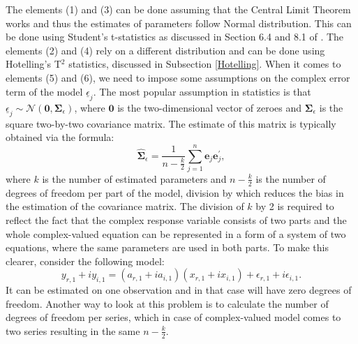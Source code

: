 \documentclass[
]{book}
\begin{document}
The elements (1) and (3) can be done assuming that the Central Limit Theorem works and thus the estimates of parameters follow Normal distribution. This can be done using Student's t-statistics as discussed in Section 6.4 and 8.1 of \citet{SvetunkovSBA}. The elements (2) and (4) rely on a different distribution and can be done using Hotelling's T\(^2\) statistics, discussed in Subsection \ref{Hotelling}. When it comes to elements (5) and (6), we need to impose some assumptions on the complex error term of the model \(\underline{\epsilon}_j\). The most popular assumption in statistics is that \(\underline{\epsilon}_j \sim \mathcal{N}(\boldsymbol{0}, \boldsymbol{\Sigma}_\epsilon)\), where \(\boldsymbol{0}\) is the two-dimensional vector of zeroes and \(\boldsymbol{\Sigma}_\epsilon\) is the square two-by-two covariance matrix. The estimate of this matrix is typically obtained via the formula:
\begin{equation*}
    \hat{\boldsymbol{\Sigma}}_\epsilon = \frac{1}{n-\frac{k}{2}} \sum_{j=1}^{n} \boldsymbol{e}_j \boldsymbol{e}_j^\prime ,
\end{equation*}
where \(k\) is the number of estimated parameters and \(n-\frac{k}{2}\) is the number of degrees of freedom per part of the model, division by which reduces the bias in the estimation of the covariance matrix. The division of \(k\) by 2 is required to reflect the fact that the complex response variable consists of two parts and the whole complex-valued equation can be represented in a form of a system of two equations, where the same parameters are used in both parts. To make this clearer, consider the following model:
\begin{equation*}
    y_{r,1} + i y_{i,1} = (a_{r,1} + i a_{i,1}) (x_{r,1} + i x_{i,1}) + \epsilon_{r,1} + i \epsilon_{i,1} .
\end{equation*}
It can be estimated on one observation and in that case will have zero degrees of freedom. Another way to look at this problem is to calculate the number of degrees of freedom per series, which in case of complex-valued model comes to two series resulting in the same \(n-\frac{k}{2}\).
\end{document}
